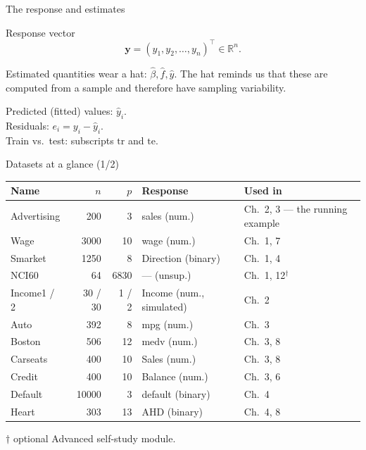 \documentclass[aspectratio=169,11pt]{beamer}
\begin{document}
\begin{frame}{The response and estimates}
  \begin{block}{Response vector}
    \[ \mathbf{y} = (y_1, y_2, \ldots, y_n)^\top \in \mathbb{R}^n. \]
  \end{block}
  \begin{readme}
    Estimated quantities wear a hat: $\hat{\beta}, \hat{f}, \hat{y}$.
    The hat reminds us that these are computed from a sample and
    therefore have sampling variability.
  \end{readme}
  \begin{numexample}
    Predicted (fitted) values: $\hat{y}_i$.\\
    Residuals: $e_i = y_i - \hat{y}_i$.\\
    Train vs.\ test: subscripts $\mathrm{tr}$ and $\mathrm{te}$.
  \end{numexample}
\end{frame}

\begin{frame}{Datasets at a glance (1/2)}
  \footnotesize
  \begin{tabular}{lrrll}
    \toprule
    \textbf{Name} & $n$ & $p$ & \textbf{Response} & \textbf{Used in} \\
    \midrule
    Advertising  &  200 &   3 & sales (num.)       & Ch.~2, 3 --- the running example \\
    Wage         & 3000 &  10 & wage (num.)        & Ch.~1, 7 \\
    Smarket      & 1250 &   8 & Direction (binary) & Ch.~1, 4 \\
    NCI60        &   64 & 6830 & --- (unsup.)       & Ch.~1, 12$^{\dagger}$ \\
    Income1 / 2  & 30 / 30 & 1 / 2 & Income (num., simulated) & Ch.~2 \\
    Auto         &  392 &   8 & mpg (num.)         & Ch.~3 \\
    Boston       &  506 &  12 & medv (num.)        & Ch.~3, 8 \\
    Carseats     &  400 &  10 & Sales (num.)       & Ch.~3, 8 \\
    Credit       &  400 &  10 & Balance (num.)     & Ch.~3, 6 \\
    Default      & 10000 &  3 & default (binary)   & Ch.~4 \\
    Heart        &  303 &  13 & AHD (binary)       & Ch.~4, 8 \\
    \bottomrule
  \end{tabular}
  \vspace{1mm}

  {\scriptsize $\dagger$ optional Advanced self-study module.}
\end{frame}
\end{document}

